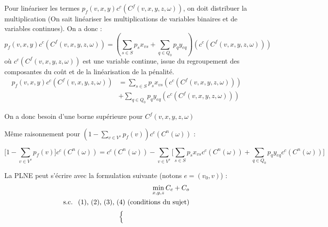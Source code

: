 \documentclass[a4paper,12pt]{article}
\begin{document}
\begin {enumerate}
{    Pour linéariser les termes $p_f(v, x, y) c^c(C^f(v, x, y, z ,\omega))$, on doit distribuer la multiplication
    (On sait linéariser les multiplications de variables binaires et de variables continues). On a donc :
    $$ p_f(v, x, y) c^c(C^f(v, x, y, z ,\omega)) = (\sum _ {s \in S} p_s x_{vs} + \sum _{q \in Q_0} p_q y _{eq}) (c^c(C^f(v, x, y, z ,\omega)))  $$
    où $c^c(C^f(v, x, y, z ,\omega))$ est une variable continue, issue du regroupement des composantes du coût et de la linéarisation de la pénalité.
    $$
    \begin{aligned}
        p_f(v, x, y) c^c(C^f(v, x, y, z ,\omega)) &= \sum _ {s \in S} p_s x_{vs} (c^c(C^f(v, x, y, z ,\omega))) \\
        &+ \sum _{q \in Q_0} p_q y _{eq} (c^c(C^f(v, x, y, z ,\omega)))
    \end{aligned}
    $$

    On a donc besoin d'une borne supérieure pour $C^f(v, x, y, z ,\omega)$

    Même raisonnement pour $(1 - \sum _{v \in V^s} p_f(v)) c^c(C^n(\omega))$ :

    $$ \lbrack 1 - \sum _{v \in V^s} p_f(v) \rbrack c^c(C^n(\omega)) = 
    c^c(C^n(\omega)) - \sum _{v \in V^s} \lbrack \sum _{s \in S} p_s x_{vs} c^c(C^n(\omega)) + \sum _{q \in Q_0} p_q y _{eq} c^c(C^n(\omega)) \rbrack  $$

    La PLNE peut s'écrire avec la formulation suivante (notons $e = (v_{0},v)$) :
    \begin{align*}
        \min_{x,y,z} C_{c}+C_{o} \\
        \text{s.c. \text{ (1), (2), (3), (4)  (conditions du sujet)}} 
    \end{align*}
    \begin{equation}
        \begin{cases}
            \begin{alignedat}{2}
                

\end{alignedat}
\end{cases}
\end{equation}}
\end{enumerate}
\end{document}
